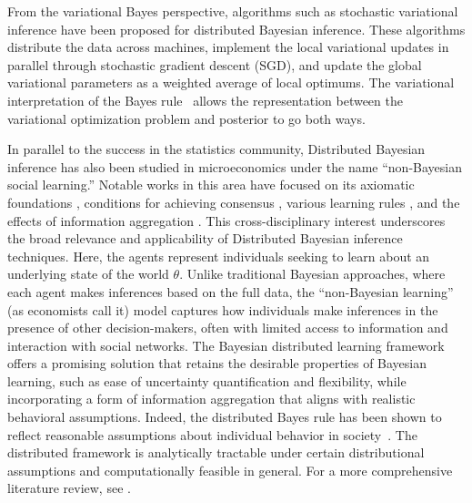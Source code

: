 \documentclass[twoside,11pt]{article}
\numberwithin{equation}{section}
\begin{document}
From the variational Bayes perspective, algorithms such as stochastic variational inference \citep{hoffman2013stochastic} have been proposed for distributed Bayesian inference. These algorithms distribute the data across machines, implement the local variational updates in parallel through stochastic gradient descent (SGD), and update the global variational parameters as a weighted average of local optimums. The variational interpretation of the Bayes rule~\citep{Walker2006} allows the representation between the variational optimization problem and posterior to go both ways. 

In parallel to the success in the statistics community, Distributed Bayesian inference has also been studied in microeconomics under the name ``non-Bayesian social learning.'' Notable works in this area have focused on its axiomatic foundations \citep{Epstein2010}, conditions for achieving consensus \citep{acemoglu2011bayesian}, various learning rules \citep{Golub2017}, and the effects of information aggregation \citep{Molavi2018}. This cross-disciplinary interest underscores the broad relevance and applicability of Distributed Bayesian inference techniques. Here, the agents represent individuals seeking to learn about an underlying state of the world $\theta$. Unlike traditional Bayesian approaches, where each agent makes inferences based on the full data, the ``non-Bayesian learning'' (as economists call it) model captures how individuals make inferences in the presence of other decision-makers, often with limited access to information and interaction with social networks. The Bayesian distributed learning framework offers a promising solution that retains the desirable properties of Bayesian learning, such as ease of uncertainty quantification and flexibility, while incorporating a form of information aggregation that aligns with realistic behavioral assumptions. Indeed, the distributed Bayes rule has been shown to reflect reasonable assumptions about individual behavior in society~\citep{Jadbabaie2012}. The distributed framework is analytically tractable under certain distributional assumptions and computationally feasible in general.  For a more comprehensive literature review, see 
\citep{Molavi2018}.  
\end{document}
